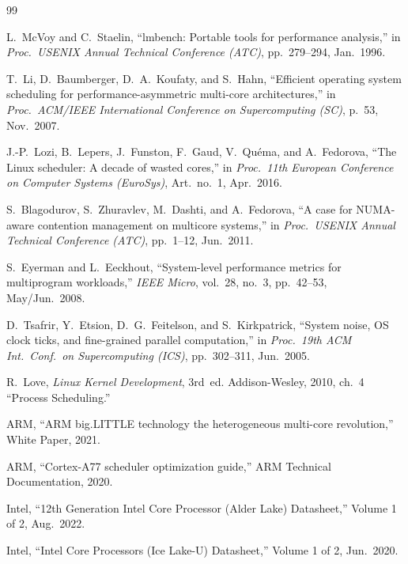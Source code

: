 \documentclass[conference]{IEEEtran}
\begin{document}
\balance
\begin{thebibliography}{99}

L.~McVoy and C.~Staelin,
``lmbench: Portable tools for performance analysis,''
in \emph{Proc.\ USENIX Annual Technical Conference (ATC)},
pp.~279--294, Jan.~1996.

T.~Li, D.~Baumberger, D.~A.~Koufaty, and S.~Hahn,
``Efficient operating system scheduling for performance-asymmetric multi-core
architectures,''
in \emph{Proc.\ ACM/IEEE International Conference on Supercomputing (SC)},
p.~53, Nov.~2007.

J.-P.~Lozi, B.~Lepers, J.~Funston, F.~Gaud, V.~Qu{\'e}ma, and A.~Fedorova,
``The Linux scheduler: A decade of wasted cores,''
in \emph{Proc.\ 11th European Conference on Computer Systems (EuroSys)},
Art.~no.~1, Apr.~2016.

S.~Blagodurov, S.~Zhuravlev, M.~Dashti, and A.~Fedorova,
``A case for NUMA-aware contention management on multicore systems,''
in \emph{Proc.\ USENIX Annual Technical Conference (ATC)},
pp.~1--12, Jun.~2011.

S.~Eyerman and L.~Eeckhout,
``System-level performance metrics for multiprogram workloads,''
\emph{IEEE Micro}, vol.~28, no.~3, pp.~42--53, May/Jun.~2008.

D.~Tsafrir, Y.~Etsion, D.~G.~Feitelson, and S.~Kirkpatrick,
``System noise, OS clock ticks, and fine-grained parallel computation,''
in \emph{Proc.\ 19th ACM Int.\ Conf.\ on Supercomputing (ICS)},
pp.~302--311, Jun.~2005.

R.~Love,
\emph{Linux Kernel Development}, 3rd~ed.
Addison-Wesley, 2010, ch.~4 ``Process Scheduling.''

ARM,
``ARM big.LITTLE technology the heterogeneous multi-core revolution,''
White Paper, 2021.

ARM,
``Cortex-A77 scheduler optimization guide,''
ARM Technical Documentation, 2020.

Intel,
``12th Generation Intel Core Processor (Alder Lake) Datasheet,''
Volume 1 of 2, Aug.~2022.

Intel,
``Intel Core Processors (Ice Lake-U) Datasheet,''
Volume 1 of 2, Jun.~2020.


\end{thebibliography}
\end{document}
